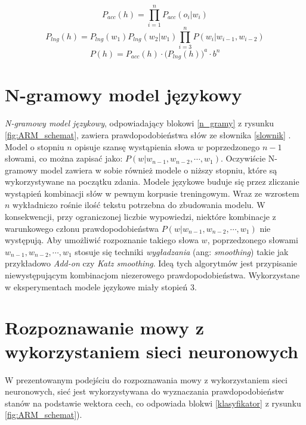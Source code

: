 \documentclass[11pt]{article}
\newcommand{\refBlock}[1]{
	\hyperref[#1]{\ref*{#1}}
}
\begin{document}
		\begin{equation}
			P_{acc}(h) = \prod_{i=1}^n P_{acc}(o_i|w_i)
		\end{equation}
		\begin{equation}
			P_{lng}(h) = P_{lng}(w_1)P_{lng}(w_2|w_1)\prod_{i=3}^nP(w_i|w_{i-1},w_{i-2})
		\end{equation}
		\begin{equation}
			P(h) = P_{acc}(h) \cdot \bigg(P_{lng}(h)\bigg)^a \cdot b^n
		\label{eqn:h_score}
		\end{equation}
	
\section{N-gramowy model językowy}
	\label{sec:ngramm}
	\textit{N-gramowy model językowy}, odpowiadający blokowi \refBlock{n_gramy} z rysunku \ref{fig:ARM_schemat}, zawiera prawdopodobieństwa słów ze słownika \refBlock{slownik}. Model o stopniu $n$ opisuje szansę wystąpienia słowa $w$ poprzedzonego $n-1$ słowami, co można zapisać jako: $P(w|w_{n-1},w_{n-2},\cdots,w_1)$. Oczywiście N-gramowy model zawiera w sobie również modele o niższy stopniu, które są wykorzystywane na początku zdania. Modele językowe buduje się przez zliczanie wystąpień kombinacji słów w pewnym korpusie treningowym. Wraz ze wzrostem $n$ wykładniczo rośnie ilość tekstu potrzebna do zbudowania modelu. W konsekwencji, przy ograniczonej liczbie wypowiedzi, niektóre kombinacje z warunkowego członu prawdopodobieństwa  $P(w|w_{n-1},w_{n-2},\cdots,w_1)$ nie występują. Aby umożliwić rozpoznanie takiego słowa $w$, poprzedzonego słowami $w_{n-1},w_{n-2},\cdots,w_1$ stosuje się techniki \textit{wygładzania} (ang: \textit{smoothing}) takie jak przykładowo \textit{Add-on} czy \textit{Katz smoothing}. Ideą tych algorytmów jest przypisanie niewystępującym kombinacjom niezerowego prawdopodobieństwa. Wykorzystane w eksperymentach modele językowe miały stopień $3$.

\section{Rozpoznawanie mowy z wykorzystaniem sieci neuronowych}
	\label{sec:ASR_NN}
	W prezentowanym podejściu do rozpoznawania mowy z wykorzystaniem sieci neuronowych, sieć jest wykorzystywana do wyznaczania prawdopodobieństw stanów na podstawie wektora cech, co odpowiada blokwi \refBlock{klasyfikator} z rysunku \ref{fig:ARM_schemat}).
	
\end{document}
